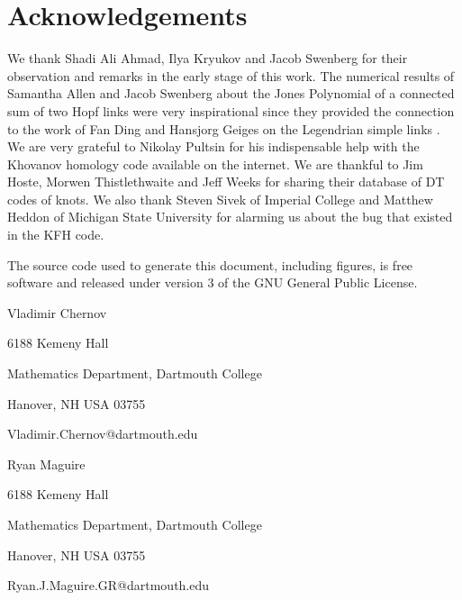 \documentclass{article}
\theoremstyle{plain}
\begin{document}
    \section{Acknowledgements}
        We thank Shadi Ali Ahmad, Ilya Kryukov and Jacob Swenberg for their
        observation and remarks in the early stage of this work. The numerical
        results of Samantha Allen and Jacob Swenberg about the Jones Polynomial
        of a connected sum of two Hopf links were very inspirational since they
        provided the connection to the work of Fan Ding and Hansjorg Geiges on
        the Legendrian simple links . We are very grateful to Nikolay Pultsin
        for his indispensable help with the Khovanov homology code available
        on the internet. We are thankful to Jim Hoste, Morwen Thistlethwaite
        and Jeff Weeks for sharing their database of DT codes of knots.
        We also thank Steven Sivek of Imperial College and Matthew Heddon
        of Michigan State University for alarming us about the bug that
        existed in the KFH code.
    \newpage
    
    
    \newpage
    The source code used to generate this document, including figures,
    is free software and released under version 3 of the GNU General Public
    License.
    \par\hfill\par
    Vladimir Chernov
    \par
    6188 Kemeny Hall
    \par
    Mathematics Department, Dartmouth College
    \par
    Hanover, NH USA 03755
    \par
    Vladimir.Chernov@dartmouth.edu
    \par\hfill\par
    Ryan Maguire
    \par
    6188 Kemeny Hall
    \par
    Mathematics Department, Dartmouth College
    \par
    Hanover, NH USA 03755
    \par
    Ryan.J.Maguire.GR@dartmouth.edu
\end{document}
